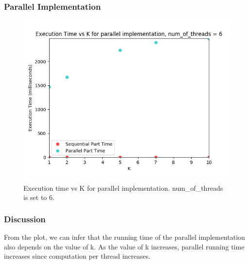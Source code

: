 \documentclass{article}
\begin{document}
\subsubsection{Parallel Implementation}
\begin{figure}[H]
\centering
\includegraphics[width=\linewidth]{assets/time_vs_K_parallel_num_of_threads_6.png}
\label{fig:test1}
\vspace{-2pt}
\caption{Execution time vs K for parallel implementation. num\_of\_threads is set to 6.}
\end{figure}
\subsubsection{Discussion}
\qquad From the plot, we can infer that the running time of the parallel implementation also depends on the value of k. As the value of k increases, parallel running time increases since computation per thread increases.
\end{document}
